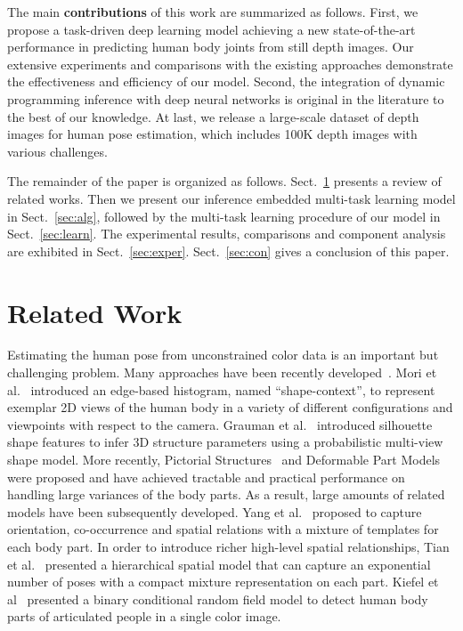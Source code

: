 \documentclass{sig-alternate-05-2015}
\begin{document}
The main \textbf{contributions} of this work are summarized as follows. First, we propose a task-driven deep learning model achieving a new state-of-the-art performance in predicting human body joints from still depth images. Our extensive experiments and comparisons with the existing approaches demonstrate the effectiveness and efficiency of our model. Second, the integration of dynamic programming inference with deep neural networks is original in the literature to the best of our knowledge. At last, we release a large-scale dataset of depth images for human pose estimation, which includes 100K depth images with various challenges.

The remainder of the paper is organized as follows. Sect.~\ref{sec:related} presents a review of related works. Then we present our inference embedded multi-task learning model in Sect.~\ref{sec:alg}, followed by the multi-task learning procedure of our model in Sect.~\ref{sec:learn}. The experimental results, comparisons and component analysis are exhibited in Sect.~\ref{sec:exper}. Sect.~\ref{sec:con} gives a conclusion of this paper.


\section{Related Work}
\label{sec:related}
Estimating the human pose from unconstrained color data is an important but challenging problem. Many approaches have been recently developed~\cite{cp80pami, shape02eccv, ia11cvpr, si03iccv, mengwang1, mengwang2, 14icme, xiaodan15iccv, xiaodan16cvpr, robust}. Mori et al.~\cite{shape02eccv} introduced an edge-based histogram, named ``shape-context'', to represent exemplar 2D views of the human body in a variety of different configurations and viewpoints with respect to the camera. Grauman et al.~\cite{si03iccv} introduced silhouette shape features to infer 3D structure parameters using a probabilistic multi-view shape model. More recently, Pictorial Structures~\cite{ps73tc, em00cvpr} and Deformable Part Models~\cite{dpm10pami, stc13acmmm, aom15pami} were proposed and have achieved tractable and practical performance on handling large variances of the body parts. As a result, large amounts of related models have been subsequently developed. Yang et al.~\cite{mof13pami} proposed to capture orientation, co-occurrence and spatial relations with a mixture of templates for each body part. In order to introduce richer high-level spatial relationships, Tian et al.~\cite{hmm12eccv} presented a hierarchical spatial model that can capture an exponential number of poses with a compact mixture representation on each part. Kiefel et al~\cite{fp14eccv} presented a binary conditional random field model to detect human body parts of articulated people in a single color image. 
\end{document}

